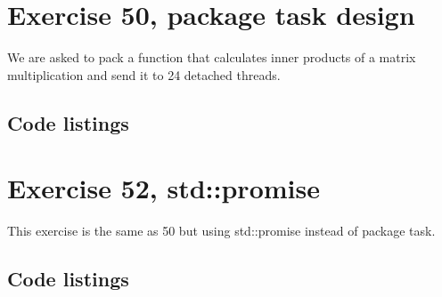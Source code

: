 \documentclass[11pt]{article}
\begin{document}
\section*{Exercise 50, package task design}
We are asked to pack a function that calculates inner products of a matrix multiplication and send it to 24 detached threads.

\subsection*{Code listings}



\section*{Exercise 52, std::promise}
This exercise is the same as 50 but using std::promise instead of package task.

\subsection*{Code listings}

\end{document}

